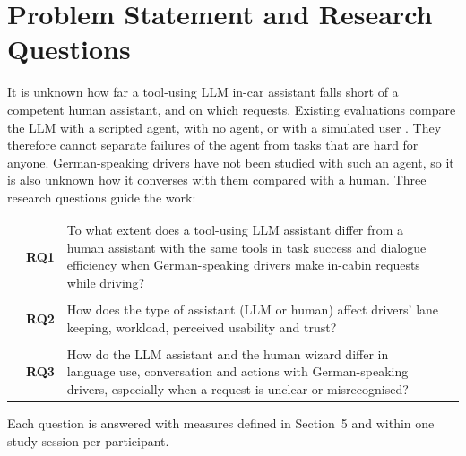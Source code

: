 \documentclass[
    a4paper,
    11pt,
    DIV=11,
    bigheadings,
    idxtotoc,
    listof=totoc,
    bibtotoc,
    halfparskip,
    cleardoubleempty,
    openright,
    oneside
]{scrartcl}
\begin{document}

\section{Problem Statement and Research Questions}

It is unknown how far a tool-using LLM in-car assistant falls short of a competent human assistant, and on which requests.
Existing evaluations compare the LLM with a scripted agent, with no agent, or with a simulated user \cite{Choe26ChatGPT,Kirmayr26CAR}.
They therefore cannot separate failures of the agent from tasks that are hard for anyone.
German-speaking drivers have not been studied with such an agent, so it is also unknown how it converses with them compared with a human.
Three research questions guide the work:

\begin{longtable}{p{0.3cm} p{0.8cm} p{12.7cm} p{0.5cm}}
    & \textbf{RQ1} & To what extent does a tool-using LLM assistant differ from a human assistant with the same tools in task success and dialogue efficiency when German-speaking drivers make in-cabin requests while driving? & \\
    & & & \\
    & \textbf{RQ2} & How does the type of assistant (LLM or human) affect drivers' lane keeping, workload, perceived usability and trust? & \\
    & & & \\
    & \textbf{RQ3} & How do the LLM assistant and the human wizard differ in language use, conversation and actions with German-speaking drivers, especially when a request is unclear or misrecognised? & \\
\end{longtable}
\addtocounter{table}{-1}

Each question is answered with measures defined in Section~5 and within one study session per participant.

\end{document}
